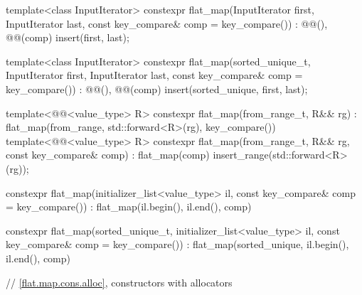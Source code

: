 \begin{codeblock}
{{    template<class InputIterator>
      constexpr flat_map(InputIterator first, InputIterator last,
                         const key_compare& comp = key_compare())
        : @@(), @@(comp) { insert(first, last); }

    template<class InputIterator>
      constexpr flat_map(sorted_unique_t, InputIterator first, InputIterator last,
                         const key_compare& comp = key_compare())
        : @@(), @@(comp) { insert(sorted_unique, first, last); }

    template<@@<value_type> R>
      constexpr flat_map(from_range_t, R&& rg)
        : flat_map(from_range, std::forward<R>(rg), key_compare()) { }
    template<@@<value_type> R>
      constexpr flat_map(from_range_t, R&& rg, const key_compare& comp)
        : flat_map(comp) { insert_range(std::forward<R>(rg)); }

    constexpr flat_map(initializer_list<value_type> il, const key_compare& comp = key_compare())
        : flat_map(il.begin(), il.end(), comp) { }

    constexpr flat_map(sorted_unique_t, initializer_list<value_type> il,
                       const key_compare& comp = key_compare())
        : flat_map(sorted_unique, il.begin(), il.end(), comp) { }

    // \ref{flat.map.cons.alloc}, constructors with allocators

}}
\end{codeblock}

